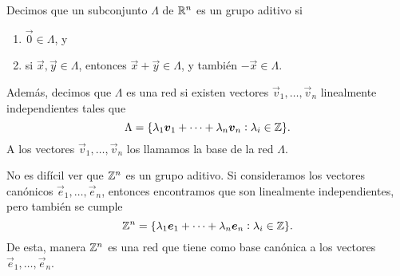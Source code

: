 \begin{definition}
	Decimos que un subconjunto $\Lambda$ de $\mathbb{R}^n$ es un grupo aditivo si
	\begin{enumerate}
		\item $\vec{0} \in \Lambda$, y
		\item si $\vec{x}, \vec{y} \in \Lambda$, entonces $\vec{x} + \vec{y} \in \Lambda$, y también
			$-\vec{x} \in \Lambda$.
	\end{enumerate}
	Además, decimos que $\Lambda$ es una red si existen vectores $\vec{v}_1, \ldots, \vec{v}_n$
	linealmente independientes tales que
	\begin{equation*}
		\Lambda = \lbrace \lambda_1\boldsymbol{v}_1 + \cdots + \lambda_n\boldsymbol{v}_n \vcentcolon \lambda_i \in
		\mathbb{Z} \rbrace.
	\end{equation*}
	A los vectores $\vec{v}_1, \ldots, \vec{v}_n$ los llamamos la base de la red $\Lambda$.
\end{definition}

\begin{example}
	No es difícil ver que $\mathbb{Z}^n$ es un grupo aditivo. Si consideramos los vectores canónicos
	$\vec{e}_1, \ldots, \vec{e}_n$, entonces encontramos que son linealmente independientes, pero
	también se cumple
	\begin{equation*}
		\mathbb{Z}^n = \lbrace \lambda_1\boldsymbol{e}_1 + \cdots + \lambda_n\boldsymbol{e}_n \vcentcolon \lambda_i \in
		\mathbb{Z} \rbrace.
	\end{equation*}
	De esta, manera $\mathbb{Z}^n$ es una red que tiene como base canónica a los vectores $\vec{e}_1,
	\ldots, \vec{e}_n$.
\end{example}

